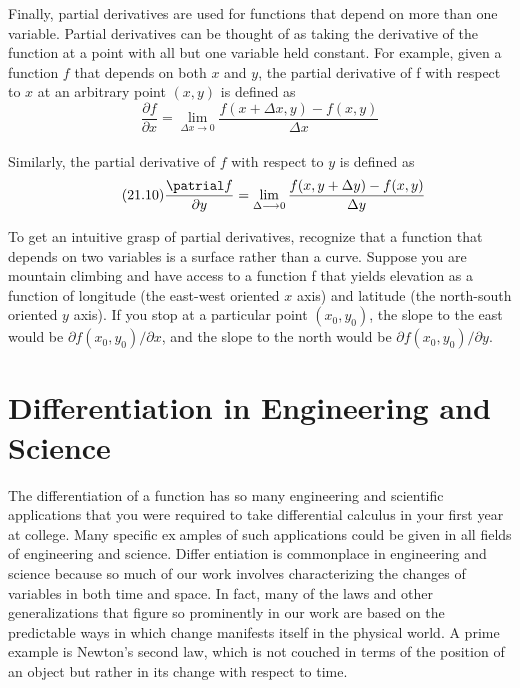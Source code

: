 Finally, partial derivatives are used for functions that depend on more than one variable.
Partial derivatives can be thought of as taking the derivative of the function at a point with
all but one variable held constant. For example, given a function $f$ that depends on both $x$
and $y$, the partial derivative of f with respect to $x$ at an arbitrary point $(x, y)$ is defined as
\begin{equation}
	\tag{21.9}
	\dfrac{\partial f}{\partial x} = \lim \limits_{\Delta x \longrightarrow 0} \dfrac{f(x+ \Delta x, y) - f(x,y)}{\Delta x}
\end{equation}\\
Similarly, the partial derivative of $f$ with respect to $y$ is defined as
\begin{equation}
	\tag{21.10}
	\dfrac{\patrial f}{\partial y} = \lim \limits_{\Delta \longrightarrow 0} \dfrac{f(x,y + \Delta y) - f(x,y)}{\Delta y}
\end{equation}

To get an intuitive grasp of partial derivatives, recognize that a function that depends on
two variables is a surface rather than a curve. Suppose you are mountain climbing and have
access to a function f that yields elevation as a function of longitude (the east-west oriented $x$ axis) and latitude (the north-south oriented $y$ axis). If you stop at a particular point $(x_{0}, y_{0})$,
the slope to the east would be $\partial f(x_{0},y_{0})/ \partial x$, and the slope to the north would be $\partial f(x_{0}, y_{0})/ \partial y$.

\section{Differentiation in Engineering and Science}
The differentiation of a function has so many engineering and scientific applications that
you were required to take differential calculus in your first year at college. Many specific examples of such applications could be given in all fields of engineering and science. Differentiation is commonplace in engineering and science because so much of our work involves
characterizing the changes of variables in both time and space. In fact, many of the laws and
other generalizations that figure so prominently in our work are based on the predictable
ways in which change manifests itself in the physical world. A prime example is Newton’s
second law, which is not couched in terms of the position of an object but rather in its change
with respect to time.

